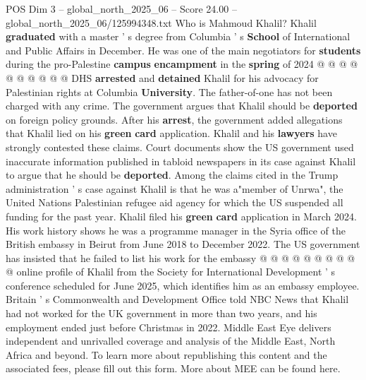 \begin{textsample}{POS Dim 3 – global\_north\_2025\_06 – Score 24.00 – global\_north\_2025\_06/125994348.txt}
Who is Mahmoud Khalil?
Khalil \textbf{graduated} with a master ' s degree from Columbia ' s \textbf{School} of International and Public Affairs in December.
He was one of the main negotiators for \textbf{students} during the pro-Palestine \textbf{campus} \textbf{encampment} in the \textbf{spring} of 2024 @ @ @ @ @ @ @ @ @ @ DHS \textbf{arrested} and \textbf{detained} Khalil for his advocacy for Palestinian rights at Columbia \textbf{University}.
The father-of-one has not been charged with any crime.
The government argues that Khalil should be \textbf{deported} on foreign policy grounds.
After his \textbf{arrest}, the government added allegations that Khalil lied on his \textbf{green} \textbf{card} application.
Khalil and his \textbf{lawyers} have strongly contested these claims.
Court documents show the US government used inaccurate information published in tabloid newspapers in its case against Khalil to argue that he should be \textbf{deported}.
Among the claims cited in the Trump administration ' s case against Khalil is that he was a"member of Unrwa", the United Nations Palestinian refugee aid agency for which the US suspended all funding for the past year.
Khalil filed his \textbf{green} \textbf{card} application in March 2024.
His work history shows he was a programme manager in the Syria office of the British embassy in Beirut from June 2018 to December 2022.
The US government has insisted that he failed to list his work for the embassy @ @ @ @ @ @ @ @ @ @ online profile of Khalil from the Society for International Development ' s conference scheduled for June 2025, which identifies him as an embassy employee.
Britain ' s Commonwealth and Development Office told NBC News that Khalil had not worked for the UK government in more than two years, and his employment ended just before Christmas in 2022.
Middle East Eye delivers independent and unrivalled coverage and analysis of the Middle East, North Africa and beyond.
To learn more about republishing this content and the associated fees, please fill out this form.
More about MEE can be found here.

\end{textsample}
